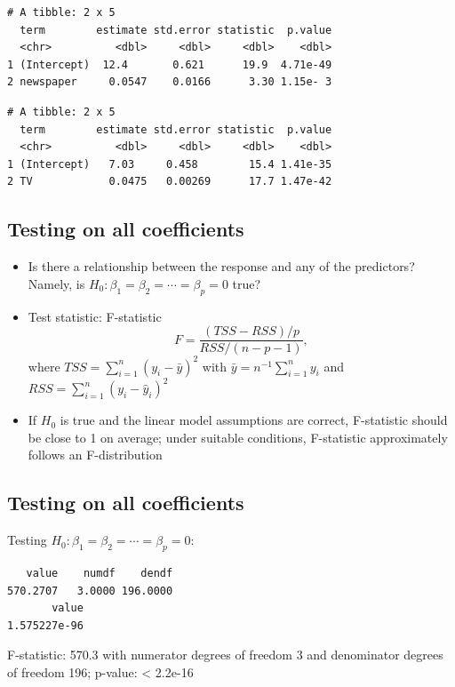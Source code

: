 \documentclass[]{article}
\providecommand{\tightlist}{%
  \setlength{\itemsep}{0pt}\setlength{\parskip}{0pt}}
\begin{document}
\begin{verbatim}
# A tibble: 2 x 5
  term        estimate std.error statistic  p.value
  <chr>          <dbl>     <dbl>     <dbl>    <dbl>
1 (Intercept)  12.4       0.621      19.9  4.71e-49
2 newspaper     0.0547    0.0166      3.30 1.15e- 3
\end{verbatim}

\begin{verbatim}
# A tibble: 2 x 5
  term        estimate std.error statistic  p.value
  <chr>          <dbl>     <dbl>     <dbl>    <dbl>
1 (Intercept)   7.03     0.458        15.4 1.41e-35
2 TV            0.0475   0.00269      17.7 1.47e-42
\end{verbatim}

\subsection{Testing on all
coefficients}\label{testing-on-all-coefficients}

\begin{itemize}
\tightlist
\item
  Is there a relationship between the response and any of the
  predictors? Namely, is \(H_0: \beta_1=\beta_2=\cdots=\beta_p=0\) true?
\item
  Test statistic: F-statistic \[F=\frac{(TSS-RSS)/p}{RSS/(n-p-1)},\]
  where \(TSS=\sum_{i=1}^n (y_i - \bar{y})^2\) with
  \(\bar{y}=n^{-1}\sum_{i=1}^n y_i\) and
  \(RSS=\sum_{i=1}^n (y_i - \hat{y}_i)^2\)
\item
  If \(H_0\) is true and the linear model assumptions are correct,
  F-statistic should be close to 1 on average; under suitable
  conditions, F-statistic approximately follows an F-distribution
\end{itemize}

\subsection{Testing on all
coefficients}\label{testing-on-all-coefficients-1}

Testing \(H_0: \beta_1=\beta_2=\cdots=\beta_p=0\):

\begin{verbatim}
   value    numdf    dendf 
570.2707   3.0000 196.0000 
       value 
1.575227e-96 
\end{verbatim}

F-statistic: 570.3 with numerator degrees of freedom 3 and denominator
degrees of freedom 196; p-value: \textless{} 2.2e-16
\end{document}
